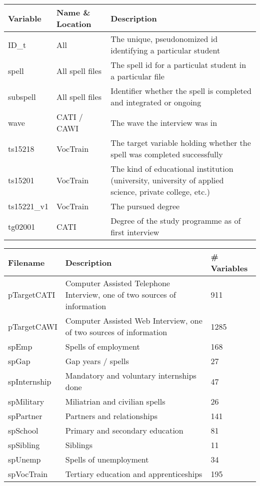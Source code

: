 \begin{table}[ht]
    \centering
    \label{tab:dataset_variables}
    \begin{tabular}{p{.13\linewidth} p{.25\linewidth} p{.52\linewidth}}
        \textbf{Variable} & \textbf{Name \& Location} & \textbf{Description}\\
        \hline
        ID\_t & All & The unique, pseudonomized id identifying a particular student\\
        spell & All spell files & The spell id for a particulat student in a particular file \\
        subspell & All spell files & Identifier whether the spell is completed and integrated or ongoing\\
        wave & CATI / CAWI & The wave the interview was in \\
        ts15218 & VocTrain%
            & The target variable holding whether the spell was completed successfully\\
        ts15201 & VocTrain & The kind of educational institution (university, university of applied science, private college, etc.)\\
        ts15221\_v1 & VocTrain & The pursued degree\\
        tg02001 & CATI & Degree of the study programme as of first interview
    \end{tabular}
\end{table}
\begin{table}[ht]
    \centering
    \label{tab:dataset_files}
    \begin{tabular}{p{.2\linewidth} p{.525\linewidth} p{.175\linewidth}}
        \textbf{Filename} & \textbf{Description} & \textbf{\# Variables}\\
        \hline
        pTargetCATI & Computer Assisted Telephone Interview, one of two sources of information & 911\\
        pTargetCAWI & Computer Assisted Web Interview, one of two sources of information & 1285\\
        spEmp & Spells of employment & 168\\
        spGap & Gap years / spells & 27\\
        spInternship & Mandatory and voluntary internships done & 47\\
        spMilitary & Miliatrian and civilian spells & 26\\
        spPartner & Partners and relationships & 141\\
        spSchool & Primary and secondary education & 81\\
        spSibling & Siblings & 11\\
        spUnemp & Spells of unemployment & 34\\
        spVocTrain & Tertiary education and apprenticeships & 195
    \end{tabular}
\end{table}